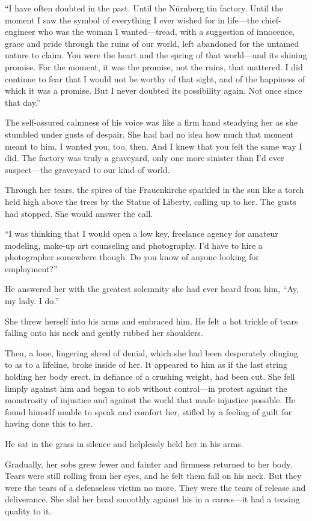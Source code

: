 ``I have often doubted in the past. Until the Nürnberg tin factory. Until the moment I saw the symbol of everything I ever wished for in life---the chief-engineer who was the woman I wanted---tread, with a suggestion of innocence, grace and pride through the ruins of our world, left abandoned for the untamed nature to claim. You were the heart and the spring of that world---and its shining promise. For the moment, it was the promise, not the ruins, that mattered. I did continue to fear that I would not be worthy of that sight, and of the happiness of which it was a promise. But I never doubted its possibility again. Not once since that day.''

The self-assured calmness of his voice was like a firm hand steadying her as she stumbled under gusts of despair. She had had no idea how much that moment meant to him. I wanted you, too, then. And I knew that you felt the same way I did. The factory was truly a graveyard, only one more sinister than I'd ever suspect---the graveyard to our kind of world.

Through her tears, the spires of the Frauenkirche sparkled in the sun like a torch held high above the trees by the Statue of Liberty, calling up to her. The gusts had stopped. She would answer the call.

``I was thinking that I would open a low key, freelance agency for amateur modeling, make-up art counseling and photography. I'd have to hire a photographer somewhere though. Do you know of anyone looking for employment?''

He answered her with the greatest solemnity she had ever heard from him, ``Ay, my lady. I do.''

She threw herself into his arms and embraced him. He felt a hot trickle of tears falling onto his neck and gently rubbed her shoulders.

Then, a lone, lingering shred of denial, which she had been desperately clinging to as to a lifeline, broke inside of her. It appeared to him as if the last string holding her body erect, in defiance of a crushing weight, had been cut. She fell limply against him and began to sob without control---in protest against the monstrosity of injustice and against the world that made injustice possible. He found himself unable to speak and comfort her, stifled by a feeling of guilt for having done this to her.

He sat in the grass in silence and helplessly held her in his arms.

Gradually, her sobs grew fewer and fainter and firmness returned to her body. Tears were still rolling from her eyes, and he felt them fall on his neck. But they were the tears of a defenseless victim no more. They were the tears of release and deliverance. She slid her head smoothly against his in a caress---it had a teasing quality to it.

